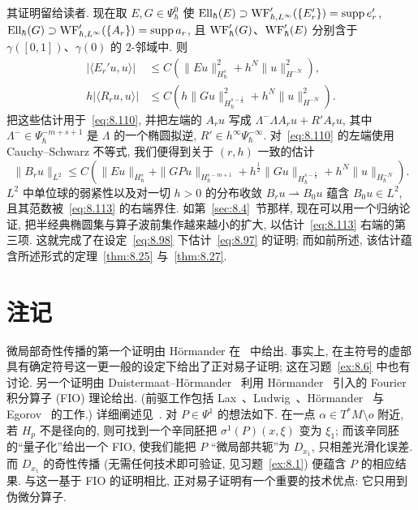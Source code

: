 其证明留给读者. 现在取 $E, G \in \Psi_\hbar^0$ 使 $\operatorname{Ell}_\hbar(E) \supset \operatorname{WF}_{\hbar, L^\infty}'(\{E_r'\}) = \operatorname{supp}e_r'$, $\operatorname{Ell}_\hbar(G) \supset \operatorname{WF}_{\hbar, L^\infty}'(\{A_r\}) = \operatorname{supp}a_r$, 且 $\operatorname{WF}_\hbar'(G)$、$\operatorname{WF}_\hbar'(E)$ 分别含于 $\gamma([0, 1])$、$\gamma(0)$ 的 $2$-邻域中. 则
\begin{equation}\label{eq:8.112}
    \begin{aligned}
        | \langle E_r' u, u \rangle | &\le C\left( \| E u \|_{H_\hbar^s}^2 + h^N \| u \|_{H^{-N}}^2 \right), \\
        h | \langle R_r u, u \rangle | &\le C\left( h \| G u \|_{H_\hbar^{s-\frac{1}{2}}}^2 + h^N \| u \|_{H^{-N}}^2 \right).
    \end{aligned}
\end{equation}
把这些估计用于~\eqref{eq:8.110}, 并把左端的 $A_r u$ 写成 $\Lambda^-\Lambda A_r u + R'A_r u$, 其中 $\Lambda^- \in \Psi_\hbar^{-m+s+1}$ 是 $\Lambda$ 的一个椭圆拟逆, $R' \in h^\infty\Psi_\hbar^{-\infty}$. 对~\eqref{eq:8.110} 的左端使用 Cauchy--Schwarz 不等式, 我们便得到关于 $(r, h)$ 一致的估计
\begin{equation}\label{eq:8.113}
    \| B_r u \|_{L^2} \le C\left( \| E u \|_{H_\hbar^s} + \| G P u \|_{H_\hbar^{s-m+1}} + h^{\frac{1}{2}}\| G u \|_{H_\hbar^{s-\frac{1}{2}}} + h^N \| u \|_{H_\hbar^{-N}} \right).
\end{equation}
$L^2$ 中单位球的弱紧性以及对一切 $h > 0$ 的分布收敛 $B_r u \rightharpoonup B_0 u$ 蕴含 $B_0 u \in L^2$, 且其范数被~\eqref{eq:8.113} 的右端界住. 如第~\ref{sec:8.4}~节那样, 现在可以用一个归纳论证, 把半经典椭圆集与算子波前集作越来越小的扩大, 以估计~\eqref{eq:8.113} 右端的第三项. 这就完成了在设定~\eqref{eq:8.98} 下估计~\eqref{eq:8.97} 的证明; 而如前所述, 该估计蕴含所述形式的定理~\ref{thm:8.25} 与~\ref{thm:8.27}.



\section*{注记}

微局部奇性传播的第一个证明由 Hörmander 在~\cite{Hor71b} 中给出. 事实上, \cite[§3.5]{Hor71b} 在主符号的虚部具有确定符号这一更一般的设定下给出了正对易子证明; 这在习题~\ref{ex:8.6} 中也有讨论. 另一个证明由 Duistermaat--Hörmander~\cite{DH72} 利用 Hörmander~\cite{Hor71a} 引入的 Fourier 积分算子 (FIO) 理论给出. (前驱工作包括 Lax~\cite{Lax57}、Ludwig~\cite{Lud60}、Hörmander~\cite{Hor68} 与 Egorov~\cite{Ego69} 的工作.) 详细阐述见~\cite{Hor09}. 对 $P \in \Psi^1$ 的想法如下. 在一点 $\alpha \in T^*M \setminus o$ 附近, 若 $H_p$ 不是径向的, 则可找到一个辛同胚把 $\sigma^1(P)(x, \xi)$ 变为 $\xi_1$; 而该辛同胚的``量子化''给出一个 FIO, 使我们能把 $P$ ``微局部共轭''为 $D_{x_1}$, 只相差光滑化误差. 而 $D_{x_1}$ 的奇性传播 (无需任何技术即可验证, 见习题~\ref{ex:8.1}) 便蕴含 $P$ 的相应结果. 与这一基于 FIO 的证明相比, 正对易子证明有一个重要的技术优点: 它只用到伪微分算子.

